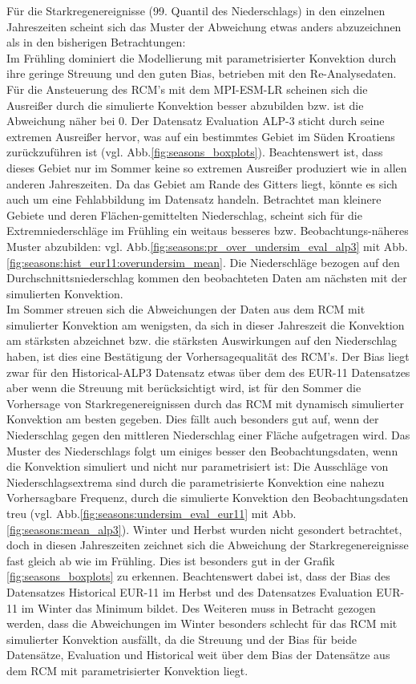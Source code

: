 Für die Starkregenereignisse (99. Quantil des Niederschlags) in den einzelnen Jahreszeiten scheint sich das Muster der Abweichung etwas anders abzuzeichnen als in den bisherigen Betrachtungen:\\
Im Frühling dominiert die Modellierung mit parametrisierter Konvektion durch ihre geringe Streuung und den guten Bias, betrieben mit den Re-Analysedaten. Für die Ansteuerung des RCM's mit dem MPI-ESM-LR scheinen sich die Ausreißer durch die simulierte Konvektion besser abzubilden bzw. ist die Abweichung näher bei 0. Der Datensatz Evaluation ALP-3 sticht durch seine extremen Ausreißer hervor, was auf ein bestimmtes Gebiet im Süden Kroatiens zurückzuführen ist (vgl. Abb.\ref{fig:seasons_boxplots}). Beachtenswert ist, dass dieses Gebiet nur im Sommer keine so extremen Ausreißer produziert wie in allen anderen Jahreszeiten. Da das Gebiet am Rande des Gitters liegt, könnte es sich auch um eine Fehlabbildung im Datensatz handeln. Betrachtet man kleinere Gebiete und deren Flächen-gemittelten Niederschlag, scheint sich für die Extremniederschläge im Frühling ein weitaus besseres bzw. Beobachtungs-näheres Muster abzubilden: vgl. Abb.\ref{fig:seasons:pr_over_undersim_eval_alp3} mit Abb.\ref{fig:seasons:hist_eur11:overundersim_mean}. Die Niederschläge bezogen auf den Durchschnittsniederschlag kommen den beobachteten Daten am nächsten mit der simulierten Konvektion.\\
Im Sommer streuen sich die Abweichungen der Daten aus dem RCM mit simulierter Konvektion am wenigsten, da sich in dieser Jahreszeit die Konvektion am stärksten abzeichnet bzw. die stärksten Auswirkungen auf den Niederschlag haben, ist dies eine Bestätigung der Vorhersagequalität des RCM's. Der Bias liegt zwar für den Historical-ALP3 Datensatz etwas über dem des EUR-11 Datensatzes aber wenn die Streuung mit berücksichtigt wird, ist für den Sommer die Vorhersage von Starkregenereignissen durch das RCM mit dynamisch simulierter Konvektion am besten gegeben. Dies fällt auch besonders gut auf, wenn der Niederschlag gegen den mittleren Niederschlag einer Fläche aufgetragen wird. Das Muster des Niederschlags folgt um einiges besser den Beobachtungsdaten, wenn die Konvektion simuliert und nicht nur parametrisiert ist: Die Ausschläge von Niederschlagsextrema sind durch die parametrisierte Konvektion eine nahezu Vorhersagbare Frequenz, durch die simulierte Konvektion den Beobachtungsdaten treu (vgl. Abb.\ref{fig:seasons:undersim_eval_eur11} mit Abb.\ref{fig:seasons:mean_alp3}).
Winter und Herbst wurden nicht gesondert betrachtet, doch in diesen Jahreszeiten zeichnet sich die Abweichung der Starkregenereignisse fast gleich ab wie im Frühling. Dies ist besonders gut in der Grafik \ref{fig:seasons_boxplots} zu erkennen. Beachtenswert dabei ist, dass der Bias des Datensatzes Historical EUR-11 im Herbst und des Datensatzes Evaluation EUR-11 im Winter das Minimum bildet. Des Weiteren muss in Betracht gezogen werden, dass die Abweichungen im Winter besonders schlecht für das RCM mit simulierter Konvektion ausfällt, da die Streuung und der Bias für beide Datensätze, Evaluation und Historical weit über dem Bias der Datensätze aus dem RCM mit parametrisierter Konvektion liegt.\\

